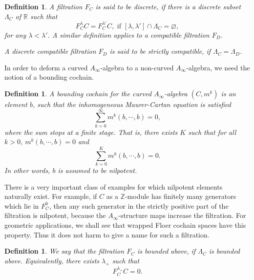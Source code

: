 \documentclass{amsart}
\newtheorem{definition}[theorem]{Definition}
\numberwithin{equation}{section}
\numberwithin{figure}{section}
\begin{document}
\begin{definition}
	A filtration $F_{C}$ is said to be discrete, if there is a discrete subset $\Lambda_{C}$ of $\mathbb{R}$ such that
\begin{equation}
F_{C}^{\lambda} C = F_{C}^{\lambda'} C, \text{ if } [\lambda, \lambda'] \cap \Lambda_{C} = \varnothing,
\end{equation}
for any $\lambda < \lambda'$. A similar definition applies to a compatible filtration $F_{D}$. \par
	A discrete compatible filtration $F_{D}$ is said to be strictly compatible, if $\Lambda_{C} = \Lambda_{D}$.
\end{definition}

	In order to deform a curved $A_{\infty}$-algebra to a non-curved $A_{\infty}$-algebra, we need the notion of a bounding cochain. \par

\begin{definition}
	A bounding cochain for the curved $A_{\infty}$-algebra $(C, m^{k})$ is an element $b$, such that the inhomogeneous Maurer-Cartan equation is satisfied
\begin{equation}\label{MC equation for curved A-infinity algebra}
\sum_{k=0}^{\infty} m^{k}(b, \cdots, b) = 0,
\end{equation}
where the sum stops at a finite stage. That is, there exists $K$ such that for all $k > 0$, $m^{k}(b, \cdots, b) = 0$ and
\begin{equation}\label{MC equation for a nilpotent element}
\sum_{k=0}^{K} m^{k}(b, \cdots, b) = 0.
\end{equation}
In other words, $b$ is assumed to be nilpotent.
\end{definition}
	
	There is a very important class of examples for which nilpotent elements naturally exist. For example, if $C$ as a $\mathbb{Z}$-module has finitely many generators which lie in $F_{C}^{0}$, then any such generator in the strictly positive part of the filtration is nilpotent, because the $A_{\infty}$-structure maps increase the filtration. For geometric applications, we shall see that wrapped Floer cochain spaces have this property. Thus it does not harm to give a name for such a filtration. \par

\begin{definition}
	We say that the filtration $F_{C}$ is bounded above, if $\Lambda_{C}$ is bounded above. Equivalently, there exists $\lambda_{+}$ such that
\begin{equation*}
F_{C}^{\lambda_{+}}C = 0. 
\end{equation*}
\end{definition}
\end{document}
